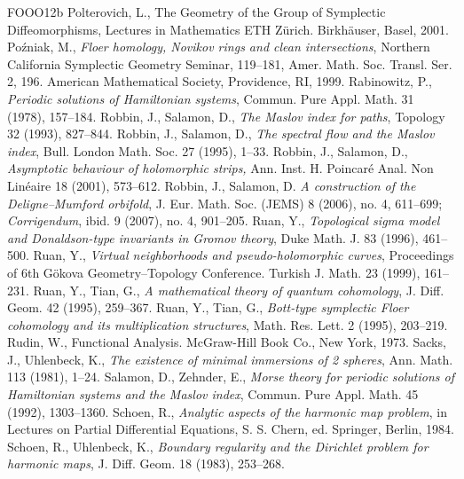 \begin{thebibliography}{FOOO12b}
 Polterovich, L., The Geometry of the Group of Symplectic Diffeomorphisms, Lectures in Mathematics ETH Zürich. Birkhäuser, Basel, 2001.
 Poźniak, M., \textit{Floer homology, Novikov rings and clean intersections}, Northern California Symplectic Geometry Seminar, 119--181, Amer. Math. Soc. Transl. Ser. 2, 196. American Mathematical Society, Providence, RI, 1999.
 Rabinowitz, P., \textit{Periodic solutions of Hamiltonian systems}, Commun. Pure Appl. Math. 31 (1978), 157--184.
 Robbin, J., Salamon, D., \textit{The Maslov index for paths}, Topology 32 (1993), 827--844.
 Robbin, J., Salamon, D., \textit{The spectral flow and the Maslov index}, Bull. London Math. Soc. 27 (1995), 1--33.
 Robbin, J., Salamon, D., \textit{Asymptotic behaviour of holomorphic strips,} Ann. Inst. H. Poincaré Anal. Non Linéaire 18 (2001), 573--612.
 Robbin, J., Salamon, D. \textit{A construction of the Deligne--Mumford orbifold}, J. Eur. Math. Soc. (JEMS) 8 (2006), no. 4, 611--699; \textit{Corrigendum}, ibid. 9 (2007), no. 4, 901--205.
 Ruan, Y., \textit{Topological sigma model and Donaldson-type invariants in Gromov theory}, Duke Math. J. 83 (1996), 461--500.
 Ruan, Y., \textit{Virtual neighborhoods and pseudo-holomorphic curves}, Proceedings of 6th Gökova Geometry--Topology Conference. Turkish J. Math. 23 (1999), 161--231.
 Ruan, Y., Tian, G., \textit{A mathematical theory of quantum cohomology}, J. Diff. Geom. 42 (1995), 259--367.
 Ruan, Y., Tian, G., \textit{Bott-type symplectic Floer cohomology and its multiplication structures}, Math. Res. Lett. 2 (1995), 203--219.
 Rudin, W., Functional Analysis. McGraw-Hill Book Co., New York, 1973.
 Sacks, J., Uhlenbeck, K., \textit{The existence of minimal immersions of 2 spheres}, Ann. Math. 113 (1981), 1--24.
 Salamon, D., Zehnder, E., \textit{Morse theory for periodic solutions of Hamiltonian systems and the Maslov index}, Commun. Pure Appl. Math. 45 (1992), 1303--1360.
 Schoen, R., \textit{Analytic aspects of the harmonic map problem}, in Lectures on Partial Differential Equations, S. S. Chern, ed. Springer, Berlin, 1984.
 Schoen, R., Uhlenbeck, K., \textit{Boundary regularity and the Dirichlet problem for harmonic maps}, J. Diff. Geom. 18 (1983), 253--268.

\end{thebibliography}
